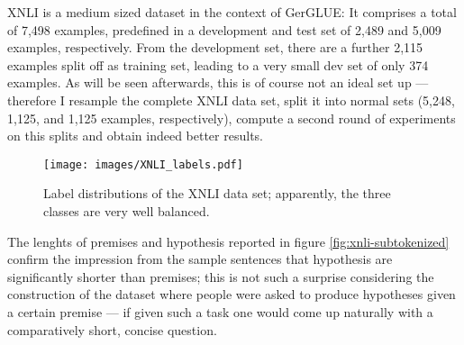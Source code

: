 
XNLI is a medium sized dataset in the context of GerGLUE: It comprises a total of 7,498 examples,
predefined in a development and test set of 2,489 and 5,009 examples, respectively. From the
development set, there are a further 2,115 examples split off as training set, leading to a very
small dev set of only 374 examples. As will be seen afterwards, this is of course not an ideal set
up --- therefore I resample the complete XNLI data set, split it into normal sets (5,248, 1,125,
and 1,125 examples, respectively), compute a second round of experiments on this splits and
obtain indeed better results.

\begin{wrapfigure}[20]{r}{0.45\linewidth}
  \begin{center}
    \texttt{[image: images/XNLI\_labels.pdf]}
  \end{center}
  \caption[XNLI labels]{Label distributions of the XNLI data set; apparently, the three classes are very well balanced.}
\end{wrapfigure}

The lenghts of premises and hypothesis reported in figure \ref{fig:xnli-subtokenized} confirm the
impression from the sample sentences that hypothesis are significantly shorter than premises;
this is not such a surprise considering the construction of the dataset where people were asked
to produce hypotheses given a certain premise --- if given such a task one would come
up naturally with a comparatively short, concise question.






